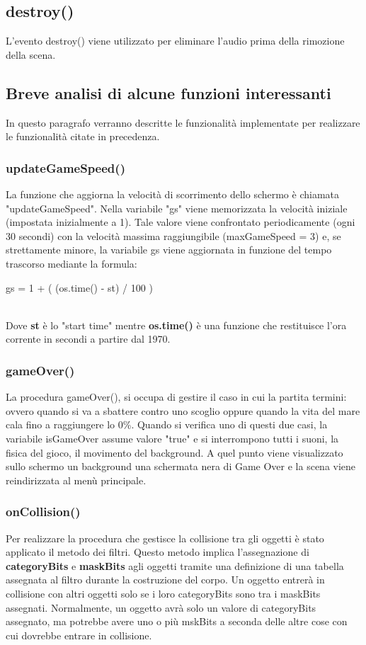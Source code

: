 \documentclass[12pt]{article}
\begin{document}
\subsection{destroy()}
L'evento destroy() viene utilizzato per eliminare l'audio prima della rimozione della scena.

\subsection{Breve analisi di alcune funzioni interessanti}
In questo paragrafo verranno descritte le funzionalità implementate per realizzare le funzionalità citate in precedenza.
\subsubsection{updateGameSpeed()}
La funzione che aggiorna la velocità di scorrimento dello schermo è chiamata "updateGameSpeed". Nella variabile "gs" viene memorizzata la velocità iniziale (impostata inizialmente a 1). Tale valore viene confrontato periodicamente (ogni 30 secondi) con la velocità massima raggiungibile (maxGameSpeed = 3) e, se strettamente minore, la variabile gs viene aggiornata in funzione del tempo trascorso mediante la formula:\\

\begin{center}
    gs = 1 + ( (os.time() - st) / 100 )
\end{center}

\\

Dove \textbf{st} è lo "start time" mentre \textbf{os.time()} è una funzione che restituisce l'ora corrente in secondi a partire dal 1970.

\subsubsection{gameOver()}
La procedura gameOver(), si occupa di gestire il caso in cui la partita termini: ovvero quando si va a sbattere contro uno scoglio oppure quando la vita del mare cala fino a raggiungere lo 0\%. Quando si verifica uno di questi due casi, la variabile isGameOver assume valore "true" e si interrompono tutti i suoni, la fisica del gioco, il movimento del background. A quel punto viene visualizzato sullo schermo un background una schermata nera di Game Over e la scena viene reindirizzata al menù principale.

\subsubsection{onCollision()}
Per realizzare la procedura che gestisce la collisione tra gli oggetti è stato applicato il metodo dei filtri. 
Questo metodo implica l'assegnazione di \textbf{categoryBits} e \textbf{maskBits} agli oggetti tramite una definizione di una 
tabella assegnata al filtro durante la costruzione del corpo. Un oggetto entrerà in collisione con altri oggetti solo se i loro 
categoryBits sono tra i maskBits assegnati. Normalmente, un oggetto avrà solo un valore di categoryBits assegnato, ma potrebbe avere 
uno o più mskBits a seconda delle altre cose con cui dovrebbe entrare in collisione.
\end{document}
